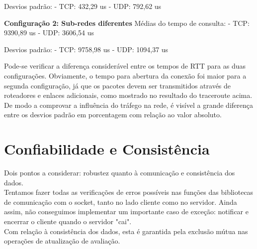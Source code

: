 \documentclass[11pt,twoside]{article}
\begin{document}
Desvios padrão:
- TCP: 432,29 us
- UDP: 792,62 us

\textbf{Configuração 2: Sub-redes diferentes}
Médias do tempo de consulta:
- TCP: 9390,89 us
- UDP: 3606,54 us

Desvios padrão:
- TCP: 9758,98 us
- UDP: 1094,37 us



Pode-se verificar a diferença considerável entre os tempos de RTT para as duas configurações. Obviamente, o tempo para abertura da conexão foi maior para a segunda 
configuração, já que os pacotes devem ser transmitidos através de roteadores e enlaces adicionais, como mostrado no resultado do traceroute acima.\\
De modo a comprovar a influência do tráfego na rede, é visível a grande diferença entre os desvios padrão em porcentagem com relação ao valor absoluto.\\


\section{Confiabilidade e Consistência}
Dois pontos a considerar: robustez quanto à comunicação e consistência dos dados.\\
Tentamos fazer todas as verificações de erros possíveis nas funções das bibliotecas de comunicação com o socket, tanto no lado cliente como no servidor. Ainda assim, não conseguimos implementar um importante caso de exceção: notificar e encerrar o cliente quando o servidor "cai".\\
Com relação à consistência dos dados, esta é garantida pela exclusão mútua nas operações de atualização de avaliação.
\end{document}

